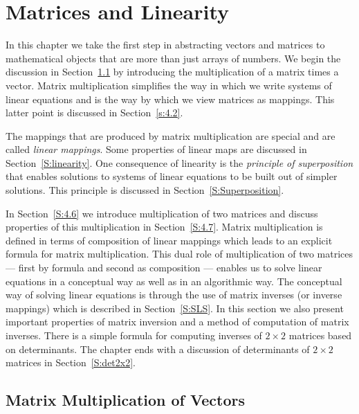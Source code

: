 \chapter{Matrices and Linearity}  \label{chap:matrices}

\normalsize

In this chapter we take the first step in abstracting vectors and matrices 
to mathematical objects that are more than just arrays of numbers.  We begin 
the discussion in Section~\ref{S:4.1} by introducing the multiplication of a 
matrix times a vector.  Matrix multiplication simplifies the way in which we 
write systems of linear equations and is the way by which we view matrices as 
mappings.  This latter point is discussed in Section~\ref{s:4.2}.

The mappings that are produced by matrix multiplication are special and
are called {\em linear mappings}.  Some properties of
linear maps are discussed in Section~\ref{S:linearity}.  One consequence of
linearity is the {\em principle of superposition\/} that enables
solutions to systems of linear equations to be built out of simpler
solutions.  This principle is discussed in Section~\ref{S:Superposition}.


In Section~\ref{S:4.6} we introduce 
multiplication of two matrices and discuss properties of this multiplication
in Section~\ref{S:4.7}.  Matrix multiplication is defined in terms of
composition of linear mappings which leads to an explicit formula for matrix
multiplication.   This dual role of multiplication of two matrices ---
first by formula and second as composition --- enables us to solve
linear equations in a conceptual way as well as in an algorithmic way.
The conceptual way of solving linear equations is through the use of
matrix inverses (or inverse mappings) which is described in
Section~\ref{S:SLS}.  In this section we also present
important properties of matrix inversion and a method of computation
of matrix inverses.  There is a simple formula for computing inverses
of $2\times 2$ matrices based on determinants.  The chapter ends with a 
discussion of determinants of $2\times 2$ matrices in Section~\ref{S:det2x2}.


\section{Matrix Multiplication of Vectors} \label{S:4.1}

